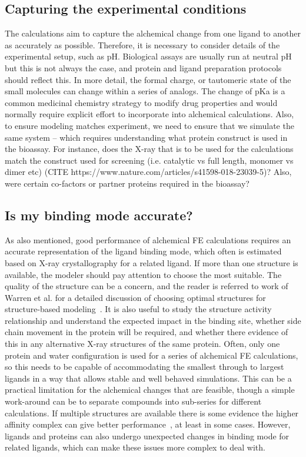 \documentclass[9pt,bestpractices]{livecoms}
\begin{document}
\subsection{Capturing the experimental conditions}
The calculations aim to capture the alchemical change from one ligand to another as accurately as possible. Therefore, it is necessary to consider details of the experimental setup, such as pH. Biological assays are usually run at neutral pH but this is not always the case, and protein and ligand preparation protocols should reflect this. In more detail, the formal charge, or tautomeric state of the small molecules can change within a series of analogs. The change of pKa is a common medicinal chemistry strategy to modify drug properties and would normally require explicit effort to incorporate into alchemical calculations. Also, to ensure modeling matches experiment, we need to ensure that we simulate the same system -- which requires understanding what protein construct is used in the bioassay. For instance, does the X-ray that is to be used for the calculations match the construct used for screening (i.e. catalytic vs full length, monomer vs dimer etc) (CITE https://www.nature.com/articles/s41598-018-23039-5)? Also, were certain co-factors or partner proteins required in the bioassay? 
%
\subsection{Is my binding mode accurate?}
As also mentioned, good performance of alchemical FE calculations requires an accurate representation of the ligand binding mode, which often is estimated based on X-ray crystallography for a related ligand. If more than one structure is available, the modeler should pay attention to choose the most suitable. The quality of the structure can be a concern, and the reader is referred to work of Warren et al. for a detailed discussion of choosing optimal structures for structure-based modeling~\cite{warren2012essential}. It is also useful to study the structure activity relationship and understand the expected impact in the binding site, whether side chain movement in the protein will be required, and whether there evidence of this in any alternative X-ray structures of the same protein. Often, only one protein and water configuration is used for a series of alchemical FE calculations, so this needs to be capable of accommodating the smallest through to largest ligands in a way that allows stable and well behaved simulations. This can be a practical limitation for the alchemical changes that are feasible, though a simple work-around can be to separate compounds into sub-series for different calculations. If multiple structures are available there is some evidence the higher affinity complex can give better performance~\cite{perez-benito2019predicting}, at least in some cases. However, ligands and proteins can also undergo unexpected changes in binding mode for related ligands, which can make these issues more complex to deal with.
\end{document}
